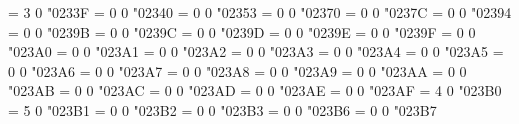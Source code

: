 \Umathchardef\APLnotslash = 3 0 "0233F %
\Umathchardef\APLnotbackslash = 0 0 "02340 %
\Umathchardef\APLboxupcaret = 0 0 "02353 %
\Umathchardef\APLboxquestion = 0 0 "02370 %
\Umathchardef\rangledownzigzagarrow = 0 0 "0237C %
\Umathchardef\hexagon = 0 0 "02394 %
\Umathchardef\lparenuend = 0 0 "0239B %
\Umathchardef\lparenextender = 0 0 "0239C %
\Umathchardef\lparenlend = 0 0 "0239D %
\Umathchardef\rparenuend = 0 0 "0239E %
\Umathchardef\rparenextender = 0 0 "0239F %
\Umathchardef\rparenlend = 0 0 "023A0 %
\Umathchardef\lbrackuend = 0 0 "023A1 %
\Umathchardef\lbrackextender = 0 0 "023A2 %
\Umathchardef\lbracklend = 0 0 "023A3 %
\Umathchardef\rbrackuend = 0 0 "023A4 %
\Umathchardef\rbrackextender = 0 0 "023A5 %
\Umathchardef\rbracklend = 0 0 "023A6 %
\Umathchardef\lbraceuend = 0 0 "023A7 %
\Umathchardef\lbracemid = 0 0 "023A8 %
\Umathchardef\lbracelend = 0 0 "023A9 %
\Umathchardef\vbraceextender = 0 0 "023AA %
\Umathchardef\rbraceuend = 0 0 "023AB %
\Umathchardef\rbracemid = 0 0 "023AC %
\Umathchardef\rbracelend = 0 0 "023AD %
\Umathchardef\intextender = 0 0 "023AE %
\Umathchardef\harrowextender = 0 0 "023AF %
\Umathchardef\lmoustache = 4 0 "023B0 %
\Umathchardef\rmoustache = 5 0 "023B1 %
\Umathchardef\sumtop = 0 0 "023B2 %
\Umathchardef\sumbottom = 0 0 "023B3 %
\Umathchardef\bbrktbrk = 0 0 "023B6 %
\Umathchardef\sqrtbottom = 0 0 "023B7 %
